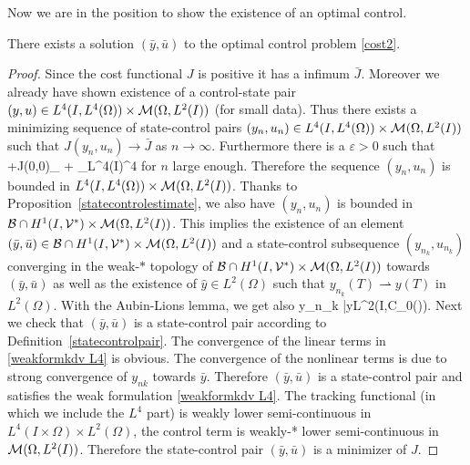 Now we are in the position to show the existence of an optimal control.
\begin{prop}
There exists a solution $(\bar y, \bar u)$ to the optimal control problem \eqref{cost2}.
\end{prop}
\begin{proof}
Since the cost functional $J$ is positive it has a infimum $\bar J$. Moreover we already have shown existence of a control-state pair $(y,u)\in L^4(I,L^4(\Omega))\times \mathcal{M}(\Omega, L^{2}(I))$ (for small data). Thus there exists a minimizing sequence of state-control pairs $(y_n,u_n) \in L^4(I,L^4(\Omega))\times \mathcal{M}(\Omega, L^{2}(I))$ such that $J(y_n, u_n) \rightarrow \bar J$ as $n \rightarrow \infty$. Furthermore there is a $\varepsilon>0$ such that
\be
\varepsilon+J(0,0)\geq \alpha {}_{\M} +  _{L^4(I\times \Omega)}^4
\ee
for $n$ large enough. Therefore the sequence $(y_n,u_n)$ is bounded in $L^4(I,L^4(\Omega))\times \mathcal{M}(\Omega, L^{2}(I))$. Thanks to Proposition~\ref{statecontrolestimate}, we also have $(y_n,u_n)$ is bounded in $\mathcal{B}\cap H^{1}(I, \mathcal{V}^{*})\times \mathcal{M}(\Omega, L^{2}(I))$. This implies the existence of an element $(\bar y, \bar u)\in \mathcal{B}\cap H^{1}(I, \mathcal{V}^{*})\times \mathcal{M}(\Omega, L^{2}(I))$ and a state-control subsequence $(y_{n_k},u_{n_k})$ converging in the weak-$*$ topology of $\mathcal{B}\cap H^{1}(I, \mathcal{V}^{*})\times\mathcal{M}(\Omega, L^{2}(I))$ towards $(\bar y, \bar u)$ as well as the existence of $\hat y \in L^2(\Omega)$ such that $y_{n_k}(T) \rightharpoonup y(T)$ in $L^2(\Omega)$. With the Aubin-Lions lemma, we get also
\be
\nonumber
y_{n_k} \rightarrow \bar y\quad{}\quad L^2(I,\mathcal C_0(\Omega)).
\ee
Next we check that $(\bar y, \bar u)$ is a state-control pair according to Definition~\ref{statecontrolpair}. The convergence of the linear terms in \eqref{weakformkdv L4} is obvious. The convergence of the nonlinear terms is due to strong convergence of $y_{nk}$ towards $\bar y$. %
Therefore $(\bar y, \bar u)$ is a state-control pair and satisfies the weak formulation \eqref{weakformkdv L4}. The tracking functional (in which we include the $L^4$ part) is weakly lower semi-continuous in $L^4(I\times \Omega)\times L^2(\Omega)$, the control term is weakly-* lower semi-continuous in $\mathcal{M}(\Omega, L^{2}(I))$. Therefore the state-control pair $(\bar y, \bar u)$ is a minimizer of $J$.
\end{proof}

